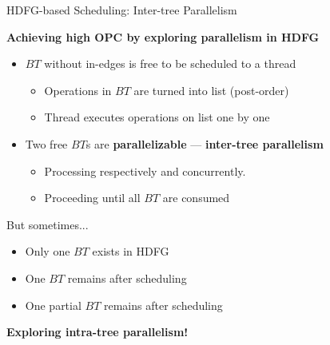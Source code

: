 \documentclass{beamer}
\begin{document}
\begin{CJK}{UTF8}{bkai}
            \begin{frame}{HDFG-based Scheduling: Inter-tree Parallelism}
                \pause
                \begin{center}
                \textbf{Achieving high OPC by exploring parallelism in HDFG}
                \end{center}
                \begin{itemize}
                        \pause
                    \item {$BT$ without in-edges is free to be scheduled to a thread
                            \begin{itemize}
                                \item Operations in $BT$ are turned into list (post-order)
                                \item Thread executes operations on list one by one
                            \end{itemize}
                        }
                        \pause
                    \item {Two free $BT$s are \textbf{parallelizable} --- \textbf{inter-tree parallelism}
                            \begin{itemize}
                                \item Processing respectively and concurrently.
                                \item Proceeding until all $BT$ are consumed
                            \end{itemize}
                        }
                \end{itemize}
                \pause
                But sometimes...
                \begin{itemize}
                    \pause
                    \item {Only one $BT$ exists in HDFG}
                    \pause
                    \item {One $BT$ remains after scheduling}
                    \pause
                    \item {One partial $BT$ remains after scheduling}
                \end{itemize}
                \pause
                \begin{center}
                \large{{\textbf{Exploring intra-tree parallelism!}}}
                \end{center}
            \end{frame}


\end{CJK}
\end{document}
